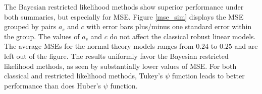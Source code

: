 \documentclass[ba]{imsart}
\begin{document}
The Bayesian restricted likelihood methods show superior performance under both summaries, but especially for MSE.  Figure \ref{mse_sim} displays the MSE grouped by pairs $a_{s}$ and $c$ with error bars plus/minus one standard error within the group.  The values of $a_{s}$ and $c$ do not affect the classical robust linear models. The average MSEs for the normal theory models ranges from $0.24$ to $0.25$ and are left out of the figure.  The results uniformly favor the Bayesian restricted likelihood methods, as seen by substantially lower values of MSE.  For both classical and restricted likelihood methods, Tukey's $\psi$ function leads to better performance than does Huber's $\psi$ function. 
\end{document}
